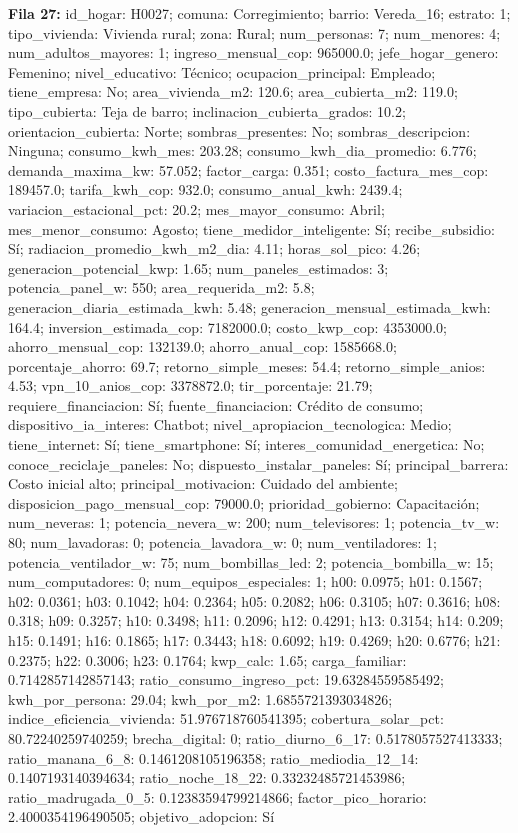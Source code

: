 {\footnotesize\textbf{Fila 27:} id\_hogar: H0027; comuna: Corregimiento; barrio: Vereda\_16; estrato: 1; tipo\_vivienda: Vivienda rural; zona: Rural; num\_personas: 7; num\_menores: 4; num\_adultos\_mayores: 1; ingreso\_mensual\_cop: 965000.0; jefe\_hogar\_genero: Femenino; nivel\_educativo: Técnico; ocupacion\_principal: Empleado; tiene\_empresa: No; area\_vivienda\_m2: 120.6; area\_cubierta\_m2: 119.0; tipo\_cubierta: Teja de barro; inclinacion\_cubierta\_grados: 10.2; orientacion\_cubierta: Norte; sombras\_presentes: No; sombras\_descripcion: Ninguna; consumo\_kwh\_mes: 203.28; consumo\_kwh\_dia\_promedio: 6.776; demanda\_maxima\_kw: 57.052; factor\_carga: 0.351; costo\_factura\_mes\_cop: 189457.0; tarifa\_kwh\_cop: 932.0; consumo\_anual\_kwh: 2439.4; variacion\_estacional\_pct: 20.2; mes\_mayor\_consumo: Abril; mes\_menor\_consumo: Agosto; tiene\_medidor\_inteligente: Sí; recibe\_subsidio: Sí; radiacion\_promedio\_kwh\_m2\_dia: 4.11; horas\_sol\_pico: 4.26; generacion\_potencial\_kwp: 1.65; num\_paneles\_estimados: 3; potencia\_panel\_w: 550; area\_requerida\_m2: 5.8; generacion\_diaria\_estimada\_kwh: 5.48; generacion\_mensual\_estimada\_kwh: 164.4; inversion\_estimada\_cop: 7182000.0; costo\_kwp\_cop: 4353000.0; ahorro\_mensual\_cop: 132139.0; ahorro\_anual\_cop: 1585668.0; porcentaje\_ahorro: 69.7; retorno\_simple\_meses: 54.4; retorno\_simple\_anios: 4.53; vpn\_10\_anios\_cop: 3378872.0; tir\_porcentaje: 21.79; requiere\_financiacion: Sí; fuente\_financiacion: Crédito de consumo; dispositivo\_ia\_interes: Chatbot; nivel\_apropiacion\_tecnologica: Medio; tiene\_internet: Sí; tiene\_smartphone: Sí; interes\_comunidad\_energetica: No; conoce\_reciclaje\_paneles: No; dispuesto\_instalar\_paneles: Sí; principal\_barrera: Costo inicial alto; principal\_motivacion: Cuidado del ambiente; disposicion\_pago\_mensual\_cop: 79000.0; prioridad\_gobierno: Capacitación; num\_neveras: 1; potencia\_nevera\_w: 200; num\_televisores: 1; potencia\_tv\_w: 80; num\_lavadoras: 0; potencia\_lavadora\_w: 0; num\_ventiladores: 1; potencia\_ventilador\_w: 75; num\_bombillas\_led: 2; potencia\_bombilla\_w: 15; num\_computadores: 0; num\_equipos\_especiales: 1; h00: 0.0975; h01: 0.1567; h02: 0.0361; h03: 0.1042; h04: 0.2364; h05: 0.2082; h06: 0.3105; h07: 0.3616; h08: 0.318; h09: 0.3257; h10: 0.3498; h11: 0.2096; h12: 0.4291; h13: 0.3154; h14: 0.209; h15: 0.1491; h16: 0.1865; h17: 0.3443; h18: 0.6092; h19: 0.4269; h20: 0.6776; h21: 0.2375; h22: 0.3006; h23: 0.1764; kwp\_calc: 1.65; carga\_familiar: 0.7142857142857143; ratio\_consumo\_ingreso\_pct: 19.63284559585492; kwh\_por\_persona: 29.04; kwh\_por\_m2: 1.6855721393034826; indice\_eficiencia\_vivienda: 51.976718760541395; cobertura\_solar\_pct: 80.72240259740259; brecha\_digital: 0; ratio\_diurno\_6\_17: 0.5178057527413333; ratio\_manana\_6\_8: 0.1461208105196358; ratio\_mediodia\_12\_14: 0.1407193140394634; ratio\_noche\_18\_22: 0.33232485721453986; ratio\_madrugada\_0\_5: 0.12383594799214866; factor\_pico\_horario: 2.4000354196490505; objetivo\_adopcion: Sí\par}
